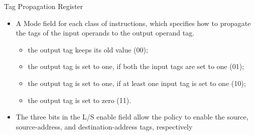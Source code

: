 \begin{frame}[noframenumbering]{Tag Propagation Register}
    \begin{table}[!t]
        \centering
        \caption{Tag Propagation Register configuration}
        \label{tab:tpr}
    \end{table}

    \begin{itemize}
        \justifying
        \item A Mode field for each class of instructions, which specifies how to propagate the tags of the input operands to the output operand tag.
              \begin{itemize}
                  \justifying
                  \item the output tag keeps its old value (00);
                  \item the output tag is set to one, if both the input tags are set to one (01);
                  \item the output tag is set to one, if at least one input tag is set to one (10);
                  \item the output tag is set to zero (11).
              \end{itemize}
        \item The three bits in the L/S enable field allow the policy to enable the source, source-address, and destination-address tags, respectively
    \end{itemize}
\end{frame}

